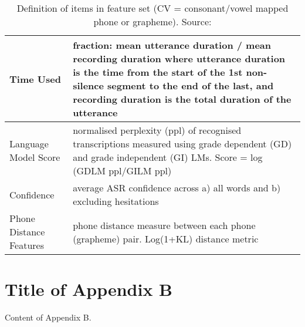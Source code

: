 \begin{table}[H]
\begin{tabular}{|>{\raggedright\arraybackslash}p{4cm}|>{\raggedright\arraybackslash}p{10cm}|}
        \hline
        Time Used                   & fraction: mean utterance duration / mean recording duration where utterance duration is the time from the start of the 1st non-silence segment to the end of the last, and recording duration is the total duration of the utterance \\
        \hline
        Language Model Score        & normalised perplexity (ppl) of recognised transcriptions measured using grade dependent (GD) and grade independent (GI) LMs. Score = log (GDLM ppl/GILM ppl)                                                                         \\
        \hline
        Confidence                  & average ASR confidence across a) all words and b) excluding hesitations                                                                                                                                                              \\
        \hline
        Phone Distance Features     & phone distance measure between each phone (grapheme) pair. Log(1+KL) distance metric                                                                                                                                                 \\
        \hline
    \end{tabular}
    \caption{Definition of items in feature set (CV = consonant/vowel mapped phone or grapheme). Source: \cite{feature}}
    \label{tab:feature_def}
\end{table}


\chapter{Title of Appendix B}
Content of Appendix B.